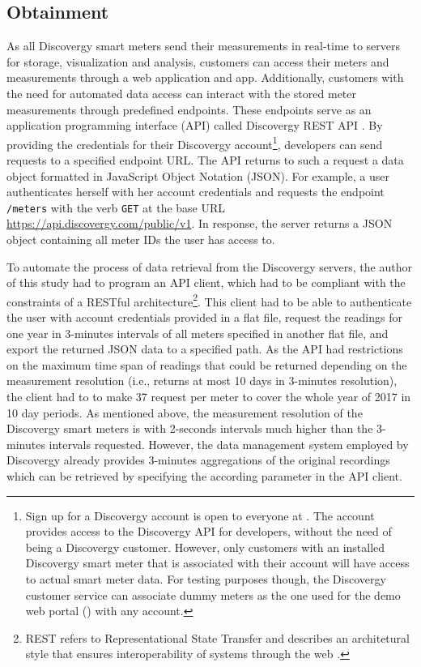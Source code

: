 
\subsection{Obtainment}\label{Sec:Data;Subsec:Obtainment}

As all Discovergy smart meters send their measurements in real-time to servers for storage, visualization and analysis, customers can access their meters and measurements through a web application and app. Additionally, customers with the need for automated data access can interact with the stored meter measurements through predefined endpoints. These endpoints serve as an application programming interface (API) called Discovergy REST API \citep{DiscovergyAPI:2018}. By providing the credentials for their Discovergy account\footnote{Sign up for a Discovergy account is open to everyone at . The account provides access to the Discovergy API for developers, without the need of being a Discovergy customer. However, only customers with an installed Discovergy smart meter that is associated with their account will have access to actual smart meter data. For testing purposes though, the Discovergy customer service can associate dummy meters as the one used for the demo web portal () with any account.}, developers can send requests to a specified endpoint URL. The API returns to such a request a data object formatted in JavaScript Object Notation (JSON). For example, a user authenticates herself with her account credentials and requests the endpoint \texttt{/meters} with the verb \texttt{GET} at the base URL \url{https://api.discovergy.com/public/v1}. In response, the server returns a JSON object containing all meter IDs the user has access to.

To automate the process of data retrieval from the Discovergy servers, the author of this study had to program an API client, which had to be compliant with the constraints of a RESTful architecture\footnote{REST refers to Representational State Transfer and describes an architetural style that ensures interoperability of systems through the web \citep[][Ch. 5]{fielding:2000}.}. This client had to be able to authenticate the user with account credentials provided in a flat file, request the readings for one year in 3-minutes intervals of all meters specified in another flat file, and export the returned JSON data to a specified path. As the API had restrictions on the maximum time span of readings that could be returned depending on the measurement resolution (i.e., returns at most 10 days in 3-minutes resolution), the client had to to make 37 request per meter to cover the whole year of 2017 in 10 day periods. As mentioned above, the measurement resolution of the Discovergy smart meters is with 2-seconds intervals much higher than the 3-minutes intervals requested. However, the data management system employed by Discovergy already provides 3-minutes aggregations of the original recordings which can be retrieved by specifying the according parameter in the API client.


